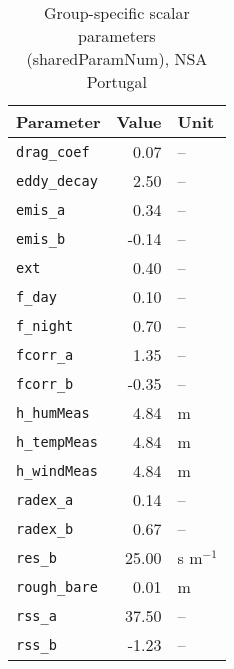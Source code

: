 \begin{table}[ht]
\centering
\caption{Group-specific scalar parameters (\textsf{sharedParamNum}), NSA Portugal} 
\label{tab:portugalNSA_sharedParamNum}
\begin{tabular}{lrl}
  \hline
Parameter & Value & Unit \\ 
  \hline
\verb!drag_coef! & 0.07 & -- \\ 
  \verb!eddy_decay! & 2.50 & -- \\ 
  \verb!emis_a! & 0.34 & -- \\ 
  \verb!emis_b! & -0.14 & -- \\ 
  \verb!ext! & 0.40 & -- \\ 
  \verb!f_day! & 0.10 & -- \\ 
  \verb!f_night! & 0.70 & -- \\ 
  \verb!fcorr_a! & 1.35 & -- \\ 
  \verb!fcorr_b! & -0.35 & -- \\ 
  \verb!h_humMeas! & 4.84 & m \\ 
  \verb!h_tempMeas! & 4.84 & m \\ 
  \verb!h_windMeas! & 4.84 & m \\ 
  \verb!radex_a! & 0.14 & -- \\ 
  \verb!radex_b! & 0.67 & -- \\ 
  \verb!res_b! & 25.00 & s m$^{-1}$ \\ 
  \verb!rough_bare! & 0.01 & m \\ 
  \verb!rss_a! & 37.50 & -- \\ 
  \verb!rss_b! & -1.23 & -- \\ 
   \hline
\end{tabular}
\end{table}
